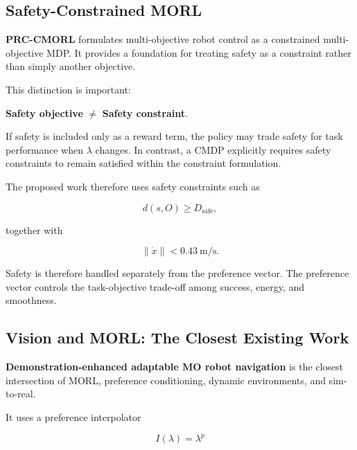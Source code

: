 \documentclass[journal]{IEEEtran}
\begin{document}
\subsection{Safety-Constrained MORL}

\textbf{PRC-CMORL} \cite{he2023} formulates multi-objective robot
control as a constrained multi-objective MDP. It provides a foundation
for treating safety as a constraint rather than simply another
objective.

This distinction is important:

\begin{center}
\textbf{Safety objective} $\neq$ \textbf{Safety constraint}.
\end{center}

If safety is included only as a reward term, the policy may trade safety
for task performance when $\lambda$ changes. In contrast, a CMDP
explicitly requires safety constraints to remain satisfied within the
constraint formulation.

The proposed work therefore uses safety constraints such as

\begin{equation}
d(s,O)\geq D_{\mathrm{safe}},
\end{equation}

together with

\begin{equation}
\|\dot{x}\|<0.43~\mathrm{m/s}.
\end{equation}

Safety is therefore handled separately from the preference vector.
The preference vector controls the task-objective trade-off among
success, energy, and smoothness.


\subsection{Vision and MORL: The Closest Existing Work}

\textbf{Demonstration-enhanced adaptable MO robot navigation}
\cite{deheuvel2025} is the closest intersection of MORL,
preference conditioning, dynamic environments, and sim-to-real.

It uses a preference interpolator

\begin{equation}
I(\lambda)=\lambda^p
\end{equation}
\end{document}
